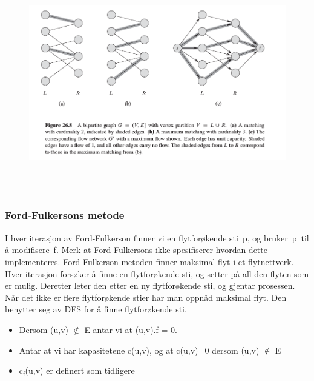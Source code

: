 \documentclass[12pt]{report}
\begin{document}
\begin{figure}[H]
	\begin{Center}
		\includegraphics[width=6.27in,height=3.76in]{./media/image145.png}
	\end{Center}
\end{figure}






\newpage
\par

\setlength{\parskip}{6.0pt}
\subsubsection*{Ford-Fulkersons metode}
\setlength{\parskip}{0.0pt}
I hver iterasjon av Ford-Fulkerson finner vi en flytforøkende sti p, og bruker p til å modifisere f. Merk at Ford-Fulkersons ikke spesifiserer hvordan dette implementeres. Ford-Fulkerson metoden finner maksimal flyt i et flytnettverk. Hver iterasjon forsøker å finne en flytforøkende sti, og setter på all den flyten som er mulig. Deretter leter den etter en ny flytforøkende sti, og gjentar prosessen. Når det ikke er flere flytforøkende stier har man oppnåd maksimal flyt. Den benytter seg av DFS for å finne flytforøkende sti. \par

\begin{itemize}
	\item Dersom (u,v) $ \notin $  E antar vi at (u,v).f = 0. \par

	\item Antar at vi har kapasitetene c(u,v), og at c(u,v)=0 dersom (u,v) $ \notin $  E \par

	\item c\textsubscript{f}(u,v) er definert som tidligere
\end{itemize}\par
\end{document}
